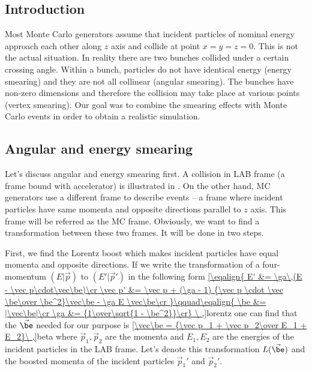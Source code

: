 
\subsection{Introduction}

Most Monte Carlo generators assume that incident particles of nominal energy approach each other along $z$ axis and collide at point $x = y = z = 0$. This is not the actual situation. In reality there are two bunches collided under a certain crossing angle. Within a bunch, particles do not have identical energy (energy smearing) and they are not all collinear (angular smearing). The bunches have non-zero dimensions and therefore the collision may take place at various points (vertex smearing). Our goal was to combine the smearing effects with Monte Carlo events in order to obtain a realistic simulation.


\subsection{Angular and energy smearing}

Let's discuss angular and energy smearing first. A collision in LAB frame (a frame bound with accelerator) is illustrated in . On the other hand, MC generators use a different frame to describe events -- a frame where incident particles have same momenta and opposite directions parallel to $z$ axis. This frame will be referred as the MC frame. Obviously, we want to find a transformation between these two frames. It will be done in two steps. 


\vfil\eject
First, we find the Lorentz boost which makes incident particles have equal momenta and opposite directions. If we write the transformation of a four-momentum $(E|\vec p)$ to $(E'|\vec p')$ in the following form
\eqref{\eqalign{
E'      &= \ga\,(E - \vec p\cdot\vec\be)\cr
\vec p' &= \vec p  +  (\ga - 1) {\vec p \cdot \vec \be\over \be^2}\vec\be - \ga E \vec\be\cr
}\qquad\eqalign{
\be &= |\vec\be|\cr
\ga &= {1\over\sqrt{1 - \be^2}}\cr}
\ ,}{lorentz}
one can find that the $\vec\be$ needed for our purpose is
\eqref{\vec\be = {\vec p_1 + \vec p_2\over E_1 + E_2}\ ,}{beta}
where $\vec p_1, \vec p_2$ are the momenta and $E_1, E_2$ are the energies of the incident particles in the LAB frame. Let's denote this transformation $L(\vec\be)$ and the boosted momenta of the incident particles $\vec p_1'$ and $\vec p_2'$.

